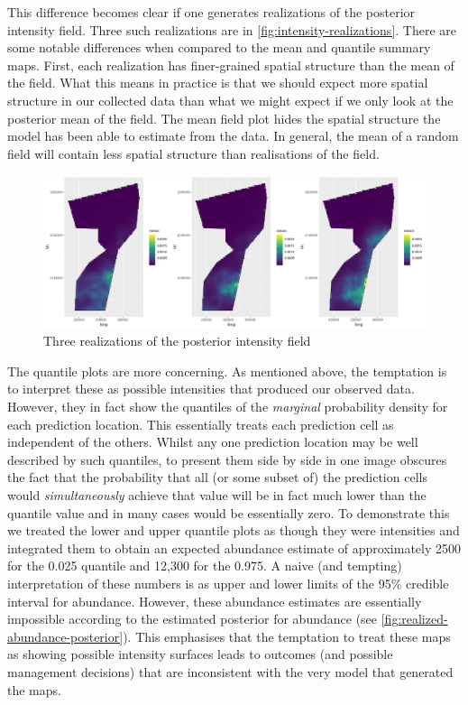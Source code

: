 \documentclass[preprint,12pt]{elsarticle}
\begin{document}
This difference becomes clear if one generates realizations of the posterior intensity field.  Three such realizations are in \autoref{fig:intensity-realizations}.  There are some notable differences when compared to the mean and quantile summary maps.  First, each realization has finer-grained spatial structure than the mean of the field.  What this means in practice is that we should expect more spatial structure in our collected data than what we might expect if we only look at the posterior mean of the field.  The mean field plot hides the spatial structure the model has been able to estimate from the data.  In general, the mean of a random field will contain less spatial structure than realisations of the field.    

\begin{figure}
	\includegraphics[scale=0.35]{figures/intensity_realized.png}
	\caption{Three realizations of the posterior intensity field}
	\label{fig:intensity-realizations}
\end{figure}

The quantile plots are more concerning.  As mentioned above, the temptation is to interpret these as possible intensities that produced our observed data.  However, they in fact show the quantiles of the \textit{marginal} probability density for each prediction location.  This essentially treats each prediction cell as independent of the others. Whilst any one prediction location may be well described by such quantiles, to present them side by side in one image obscures the fact that the probability that all (or some subset of) the prediction cells would \textit{simultaneously} achieve that value will be in fact much lower than the quantile value and in many cases would be essentially zero.  To demonstrate this we treated the lower and upper quantile plots as though they were intensities and integrated them to obtain an expected abundance estimate of approximately 2500 for the 0.025 quantile and 12,300 for the 0.975.  A naive (and tempting) interpretation of these numbers is as upper and lower limits of the 95\% credible interval for abundance. However, these abundance estimates are essentially impossible according to the estimated posterior for abundance (see \autoref{fig:realized-abundance-posterior}).  This emphasises that the temptation to treat these maps as showing possible intensity surfaces leads to outcomes (and possible management decisions) that are inconsistent with the very model that generated the maps.  
\end{document}
